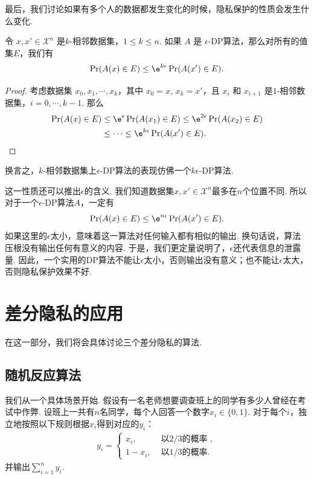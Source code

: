 最后，我们讨论如果有多个人的数据都发生变化的时候，隐私保护的性质会发生什么变化. 

\begin{proposition}[群体隐私]\label{prop:group-privacy}
    令 $x, x' \in \mathcal X^n$ 是$k$-相邻数据集，$1 \leq k \leq n$. 如果 $A$ 是 $\epsilon$-DP算法，那么对所有的值集$E$，我们有
    \[
    \Pr(A(x) \in E) \leq \e^{k\epsilon}\Pr(A(x') \in E).
    \]
\end{proposition}
\begin{proof}
    考虑数据集 $x_0, x_1, \cdots , x_k$，其中 $x_0 = x$, $x_k = x'$，且 $x_i$ 和 $x_{i+1}$ 是$1$-相邻数据集，$i = 0, \cdots, k-1$. 那么
    \[
    \begin{aligned}
    \Pr(A(x) \in E) &\leq \e^{\epsilon}\Pr(A(x_1) \in E) \leq \e^{2\epsilon}\Pr(A(x_2) \in E)\\
    &\leq \cdots \leq \e^{k\epsilon}\Pr(A(x') \in E).
    \end{aligned}
    \]
\end{proof}

换言之，$k$-相邻数据集上$\epsilon$-DP算法的表现仿佛一个$k\epsilon$-DP算法. 

这一性质还可以推出$\epsilon$的含义. 我们知道数据集$x, x' \in \mathcal X^n$最多在$n$个位置不同. 所以对于一个$\epsilon$-DP算法$A$，一定有
        \[
        \Pr(A(x) \in E) \leq \e^{n\epsilon}\Pr(A(x') \in E).
        \]
如果这里的$\epsilon$太小，意味着这一算法对任何输入都有相似的输出. 换句话说，算法压根没有输出任何有意义的内容. 于是，我们更定量说明了，$\epsilon$还代表信息的泄露量. 因此，一个实用的DP算法不能让$\epsilon$太小，否则输出没有意义；也不能让$\epsilon$太大，否则隐私保护效果不好.

\section{差分隐私的应用}
在这一部分，我们将会具体讨论三个差分隐私的算法. 

\subsection{随机反应算法}
我们从一个具体场景开始. 假设有一名老师想要调查班上的同学有多少人曾经在考试中作弊. 设班上一共有$n$名同学，每个人回答一个数字$x_i \in \{0,1\}$. 对于每个$i$，独立地按照以下规则根据$x_i$得到对应的$y_i$：
\[\begin{aligned}
    y_i =
    \begin{cases}
        x_i, & \text{ 以$2/3$的概率 }, \\
        1 - x_i,& \text{ 以$1/3$的概率}.
    \end{cases}
\end{aligned}\]
并输出$\sum_{i=1}^n y_i$. 

